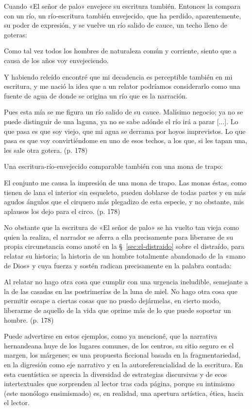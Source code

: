 \documentclass[14pt,twoside,final]{extbook} %
\begin{document}
Cuando «El señor de palo» envejece su escritura también. Entonces la compara con un río, un río-escritura también envejecido, que ha perdido, aparentemente, su poder de expresión, y se vuelve un río salido de cauce, un techo lleno de goteras:
\begin{quoting}
Como tal vez todos los hombres de naturaleza común y corriente, siento que a causa de los años voy envejeciendo.

Y habiendo releído encontré que mi decadencia es perceptible también en mi escritura, y me nació la idea que a un relator podríamos considerarlo como una fuente de agua de donde se origina un río que es la narración.

Pues esta mía se me figura un río salido de su cauce. Malísimo negocio; ya no se puede distinguir de una laguna, ya no se sabe adónde el río irá a parar [...]. Lo que pasa es que soy viejo, que mi agua se derrama por hoyos imprevistos. Lo que pasa es que voy convirtiéndome en uno de esos techos, a los que, si les tapan una, les sale otra gotera. (p. 178)
\end{quoting}
Una escritura-río-envejecido comparable también con una mona de trapo:
\begin{quoting}
El conjunto me causa la impresión de una mona de trapo. Las monas éstas, como tienen de lana el interior sin esqueleto, pueden doblarse de todas partes y en más agudos ángulos que el cirquero más plegadizo de esta especie, y no obstante, mis aplausos los dejo para el circo. (p. 178)
\end{quoting}
No obstante que la escritura de «El señor de palo» se ha vuelto tan vieja como quien la realiza, el narrador se aferra a ella precisamente para liberarse de su propia circunstancia como anoté en la \S~\ref{sec:el-distraido} sobre el distraído, para relatar su historia; la historia de un hombre totalmente abandonado de la «mano de Dios» y cuya fuerza y sostén radican precisamente en la palabra contada:
\begin{quoting}
Al relatar no hago otra cosa que cumplir con una urgencia ineludible, semejante a la de las casadas en las postrimerías de la luna de miel. No hago otra cosa que permitir escape a ciertas cosas que no puedo dejármelas, en cierto modo, liberarme de aquello de la vida que oprime más de lo que puede soportar un hombre. (p. 178)
\end{quoting}
Puede advertirse en estos ejemplos, como ya mencioné, que la narrativa hernandeana huye de los lugares comunes, de los centros, su sitio seguro es el margen, los márgenes; es una propuesta ficcional basada en la fragmentariedad, en la digresión como eje narrativo y en la autoreferencialidad de la escritura. En esta cuentística se aprecia la diversidad de estrategias discursivas y de ecos intertextuales que sorprenden al lector tras cada página, porque su intimismo (este monólogo ensimismado) es, en realidad, una apertura artística, ética, hacia el lector.
\end{document}

